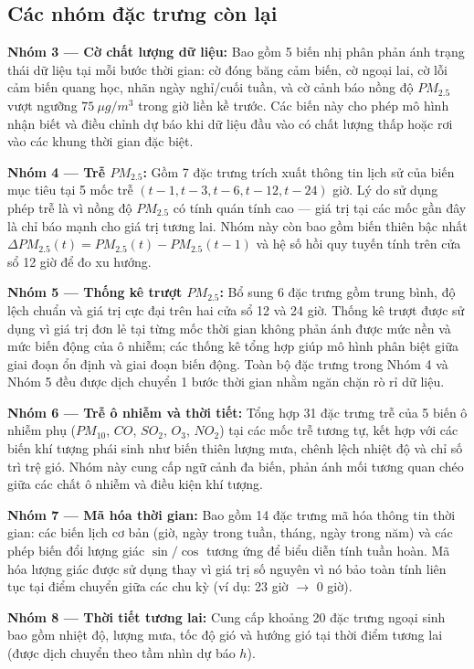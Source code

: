 \subsection{Các nhóm đặc trưng còn lại}

\textbf{Nhóm 3 --- Cờ chất lượng dữ liệu:} Bao gồm 5 biến nhị phân phản ánh trạng thái dữ liệu tại mỗi bước thời gian: cờ đóng băng cảm biến, cờ ngoại lai, cờ lỗi cảm biến quang học, nhãn ngày nghỉ/cuối tuần, và cờ cảnh báo nồng độ $PM_{2.5}$ vượt ngưỡng $75~\mu g/m^3$ trong giờ liền kề trước. Các biến này cho phép mô hình nhận biết và điều chỉnh dự báo khi dữ liệu đầu vào có chất lượng thấp hoặc rơi vào các khung thời gian đặc biệt.

\textbf{Nhóm 4 --- Trễ $PM_{2.5}$:} Gồm 7 đặc trưng trích xuất thông tin lịch sử của biến mục tiêu tại 5 mốc trễ $(t-1, t-3, t-6, t-12, t-24)$ giờ. Lý do sử dụng phép trễ là vì nồng độ $PM_{2.5}$ có tính quán tính cao --- giá trị tại các mốc gần đây là chỉ báo mạnh cho giá trị tương lai. Nhóm này còn bao gồm biến thiên bậc nhất $\Delta PM_{2.5}(t) = PM_{2.5}(t) - PM_{2.5}(t-1)$ và hệ số hồi quy tuyến tính trên cửa sổ 12 giờ để đo xu hướng.

\textbf{Nhóm 5 --- Thống kê trượt $PM_{2.5}$:} Bổ sung 6 đặc trưng gồm trung bình, độ lệch chuẩn và giá trị cực đại trên hai cửa sổ 12 và 24 giờ. Thống kê trượt được sử dụng vì giá trị đơn lẻ tại từng mốc thời gian không phản ánh được mức nền và mức biến động của ô nhiễm; các thống kê tổng hợp giúp mô hình phân biệt giữa giai đoạn ổn định và giai đoạn biến động. Toàn bộ đặc trưng trong Nhóm 4 và Nhóm 5 đều được dịch chuyển 1 bước thời gian nhằm ngăn chặn rò rỉ dữ liệu.

\textbf{Nhóm 6 --- Trễ ô nhiễm và thời tiết:} Tổng hợp 31 đặc trưng trễ của 5 biến ô nhiễm phụ ($PM_{10}$, $CO$, $SO_2$, $O_3$, $NO_2$) tại các mốc trễ tương tự, kết hợp với các biến khí tượng phái sinh như biến thiên lượng mưa, chênh lệch nhiệt độ và chỉ số trì trệ gió. Nhóm này cung cấp ngữ cảnh đa biến, phản ánh mối tương quan chéo giữa các chất ô nhiễm và điều kiện khí tượng.

\textbf{Nhóm 7 --- Mã hóa thời gian:} Bao gồm 14 đặc trưng mã hóa thông tin thời gian: các biến lịch cơ bản (giờ, ngày trong tuần, tháng, ngày trong năm) và các phép biến đổi lượng giác $\sin/\cos$ tương ứng để biểu diễn tính tuần hoàn. Mã hóa lượng giác được sử dụng thay vì giá trị số nguyên vì nó bảo toàn tính liên tục tại điểm chuyển giữa các chu kỳ (ví dụ: 23 giờ $\rightarrow$ 0 giờ).

\textbf{Nhóm 8 --- Thời tiết tương lai:} Cung cấp khoảng 20 đặc trưng ngoại sinh bao gồm nhiệt độ, lượng mưa, tốc độ gió và hướng gió tại thời điểm tương lai (được dịch chuyển theo tầm nhìn dự báo $h$). 

